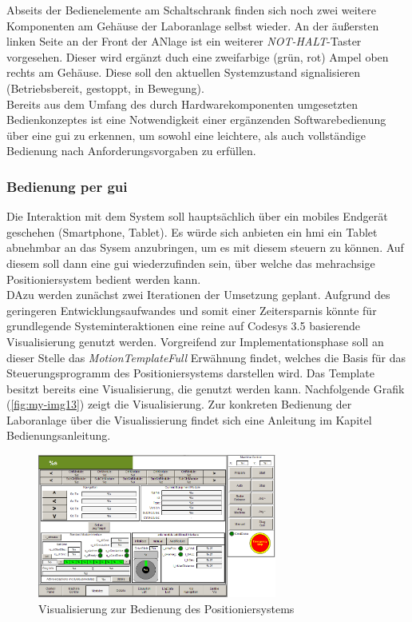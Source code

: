 \documentclass[../../../Bachelorarbeit.tex]{subfiles}
\begin{document}
Abseits der Bedienelemente am Schaltschrank finden sich noch zwei weitere Komponenten am Gehäuse der Laboranlage selbst wieder. An der äußersten linken Seite an der Front der ANlage ist ein weiterer \textit{NOT-HALT}-Taster vorgesehen. Dieser wird ergänzt duch eine zweifarbige (grün, rot) Ampel oben rechts am Gehäuse. Diese soll den aktuellen Systemzustand signalisieren (Betriebsbereit, gestoppt, in Bewegung).\\
Bereits aus dem Umfang des durch Hardwarekomponenten umgesetzten Bedienkonzeptes ist eine Notwendigkeit einer ergänzenden Softwarebedienung über eine \acs{gui} zu erkennen, um sowohl eine leichtere, als auch vollständige Bedienung nach Anforderungsvorgaben zu erfüllen.

\subsubsection{Bedienung per \acs{gui}}
Die Interaktion mit dem System soll hauptsächlich über ein mobiles Endgerät geschehen (\zB Smartphone, Tablet). Es würde sich anbieten ein \acs{hmi} \bzw ein Tablet abnehmbar an das Sysem anzubringen, um es mit diesem steuern zu können. Auf diesem soll dann eine \acs{gui} wiederzufinden sein, über welche das mehrachsige Positioniersystem bedient werden kann. \\
DAzu werden zunächst zwei Iterationen der Umsetzung geplant. Aufgrund des geringeren Entwicklungsaufwandes und somit einer Zeitersparnis könnte für grundlegende Systeminteraktionen eine reine auf Codesys 3.5 basierende Visualisierung genutzt werden. Vorgreifend zur Implementationsphase soll an dieser Stelle das \textit{MotionTemplateFull} Erwähnung findet, welches die Basis für das Steuerungsprogramm des Positioniersystems darstellen wird. Das Template besitzt bereits eine Visualisierung, die genutzt werden kann. Nachfolgende Grafik (\autoref{fig:my-img13}) zeigt die Visualisierung. Zur konkreten Bedienung der Laboranlage über die Visualissierung findet sich eine Anleitung im Kapitel Bedienungsanleitung. %

\begin{figure}[H]
    \centering
    \includegraphics[width=0.7\textwidth]{Images/Visu.PNG}
    \caption[Visualisierung zur Bedienung]{Visualisierung zur Bedienung des Positioniersystems}
    \label{fig:my-img13}
\end{figure}
\end{document}
